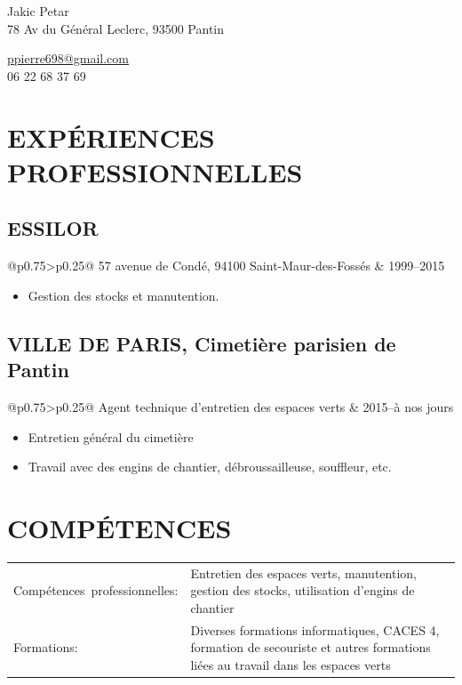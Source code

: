\documentclass[a4paper]{article}
\makeatletter
\newlength{\tablewidth}
\newenvironment{period}[2]{%
	\setlength{\tablewidth}{\linewidth}
	\addtolength{\tablewidth}{-2\tabcolsep}
	\begin{tabular}{@{}p{0.75\tablewidth}>{\raggedleft\arraybackslash}p{0.25\tablewidth}@{}}%
		#1 & #2 \\
	\end{tabular}%
	\vspace{0.15em}
	\begin{itemize}[leftmargin=1.2em]
	}{%
	\end{itemize}
	\vspace{0.5em}
}
\newenvironment{skills}{%
	\setlength{\tablewidth}{\linewidth}
	\addtolength{\tablewidth}{-2\tabcolsep}
	\begin{tabular}{@{}p{0.32\tablewidth}p{0.68\tablewidth}@{}}
	}{%
	\end{tabular}
}
\makeatother
\begin{document}
	
	\fontfamily{\sfdefault}
	\selectfont
	
	\begin{minipage}{.5\textwidth}
		\LARGE Jakic Petar\\
		\normalsize 78 Av du Général Leclerc, 93500 Pantin
	\end{minipage}%
	\begin{minipage}{.5\textwidth}
		\raggedleft
		\href{mailto:ppierre698@gmail.com}{ppierre698@gmail.com} \\
		06 22 68 37 69
	\end{minipage}
	
	\vspace{1em}
	
	\section{EXPÉRIENCES PROFESSIONNELLES}
	
	\subsection{ESSILOR}
	
	\begin{period}{57 avenue de Condé, 94100 Saint-Maur-des-Fossés}{1999--2015}
		\item Gestion des stocks et manutention.
	\end{period}
	
		\vspace{1em}
	
	\subsection{VILLE DE PARIS, Cimetière parisien de Pantin}
	
	\begin{period}{Agent technique d’entretien des espaces verts}{2015--à nos jours}
		\item Entretien général du cimetière
		\item Travail avec des engins de chantier, débroussailleuse, souffleur, etc.
	\end{period}
	
	\section{COMPÉTENCES}
	
	\begin{skills}
		Compétences~professionnelles: &
		Entretien des espaces verts, manutention, gestion des stocks, utilisation d'engins de chantier \\
		Formations: &
		Diverses formations informatiques, CACES 4, formation de secouriste et autres formations liées au travail dans les espaces verts \\
	\end{skills}
	
\end{document}
